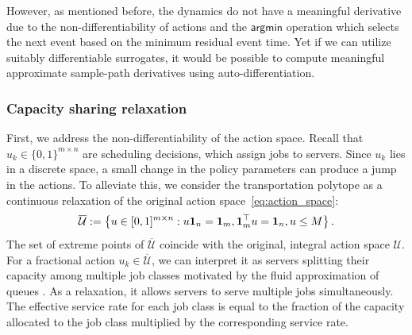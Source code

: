However, as mentioned before, the dynamics do not have a meaningful derivative due to the non-differentiability of actions and the $\mathsf{argmin}$ operation which selects the next event based on the minimum residual event time. Yet if we can utilize suitably differentiable surrogates, it would be possible to compute meaningful approximate sample-path derivatives using auto-differentiation.

\subsubsection{Capacity sharing relaxation} 

First, we address the non-differentiability of the action space. Recall that $u_{k} \in \{0,1\}^{m \times n}$ are scheduling decisions, which assign jobs to servers. Since $u_{k}$ lies in a discrete space, a small change in the policy parameters can produce a jump in the actions. To alleviate this, we consider the transportation polytope as a continuous relaxation of the original action space~\eqref{eq:action_space}:
\begin{equation}
\label{eq:bar_action_space}
\overline{\mathcal{U}}:=\left\{ u\in [0,1]^{m\times n}:u\mathbf{1}_{n} = \mathbf{1}_{m}, \mathbf{1}_{m}^{\top} u=\mathbf{1}_{n},u\leq M\right\}.
\end{equation}
The set of extreme points of $\overline{\mathcal{U}}$ coincide with the original, integral action space $\mathcal{U}$. %
For a fractional action $u_{k}\in \overline{\mathcal{U}}$, %
we can interpret it as servers splitting their capacity among multiple job classes motivated by the fluid approximation of queues \cite{chen1994hierarchical}. As a relaxation, it allows servers to serve multiple jobs simultaneously. The effective service rate for each job class is equal to the fraction of the capacity allocated to the job class multiplied by the corresponding service rate. 

